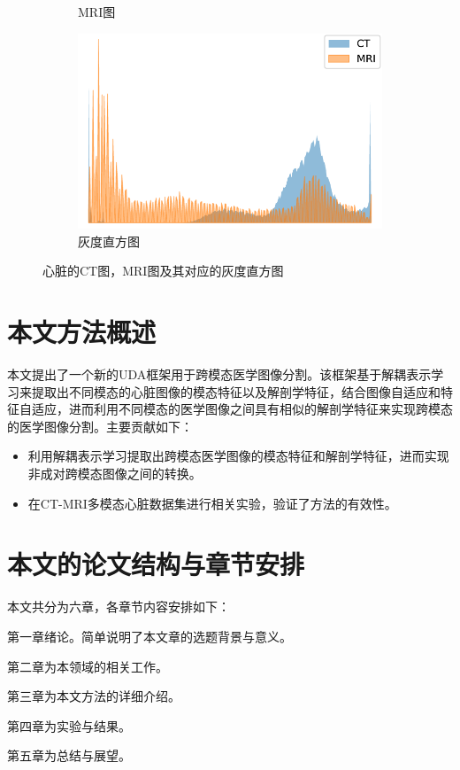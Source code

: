 \begin{figure}
\begin{subfigure}{0.3\textwidth}
        \caption{MRI图}
        \label{hist:b}
    \end{subfigure}
    \hfill
    \begin{subfigure}{0.3\textwidth}
        \includegraphics[width=\textwidth,height=.8\textwidth]{image/chap01/hist.pdf}
        \caption{灰度直方图}
        \label{hist:c}
    \end{subfigure}
    \caption{心脏的CT图，MRI图及其对应的灰度直方图}
    \label{fig:hist}
    \end{figure}


\section{本文方法概述}
\label{sec:contributions}
本文提出了一个新的UDA框架用于跨模态医学图像分割。该框架基于解耦表示学习来提取出不同模态的心脏图像的模态特征以及解剖学特征，结合图像自适应和特征自适应，进而利用不同模态的医学图像之间具有相似的解剖学特征来实现跨模态的医学图像分割。主要贡献如下：
\begin{itemize}
    \item 利用解耦表示学习提取出跨模态医学图像的模态特征和解剖学特征，进而实现非成对跨模态图像之间的转换。
    \item 在CT-MRI多模态心脏数据集进行相关实验，验证了方法的有效性。
\end{itemize}

\newpage
\section{本文的论文结构与章节安排}
\label{sec:arrangement}

本文共分为六章，各章节内容安排如下：

第一章绪论。简单说明了本文章的选题背景与意义。

第二章为本领域的相关工作。

第三章为本文方法的详细介绍。

第四章为实验与结果。

第五章为总结与展望。

